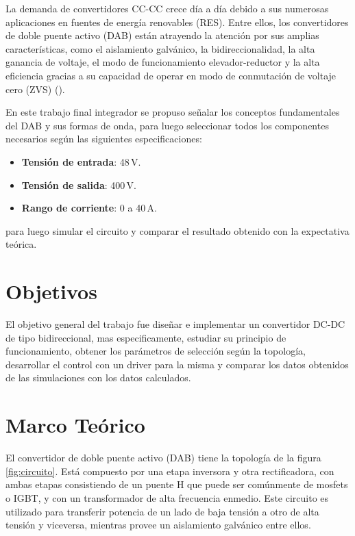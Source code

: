 \documentclass[11pt, a4paper]{article}
\begin{document}
La demanda de convertidores CC-CC crece día a día debido a sus numerosas aplicaciones en fuentes de energía renovables (RES). Entre ellos, los convertidores de doble puente activo (DAB) están atrayendo la atención por sus amplias características, como el aislamiento galvánico, la bidireccionalidad, la alta ganancia de voltaje, el modo de funcionamiento elevador-reductor y la alta eficiencia gracias a su capacidad de operar en modo de conmutación de voltaje cero (ZVS) (\cite{navamani}).

En este trabajo final integrador se propuso señalar los conceptos fundamentales del DAB y sus formas de onda, para luego seleccionar todos los componentes necesarios según las siguientes especificaciones:

\begin{itemize}
    \item \textbf{Tensión de entrada}: 48\,V.
    \item \textbf{Tensión de salida}: 400\,V.
    \item \textbf{Rango de corriente}: 0 a 40\,A.
\end{itemize}

\noindent
para luego simular el circuito y comparar el resultado obtenido con la expectativa teórica.

\section{Objetivos}

El objetivo general del trabajo fue diseñar e implementar un convertidor DC-DC de tipo bidireccional, mas especificamente, estudiar su principio de funcionamiento, obtener los parámetros de selección según la topología, desarrollar el control con un driver para la misma y comparar los datos obtenidos de las simulaciones con los datos calculados.

\section{Marco Teórico}

El convertidor de doble puente activo (DAB) tiene la topología de la figura \ref{fig:circuito}. Está compuesto por una etapa inversora y otra rectificadora, con ambas etapas consistiendo de un puente H que puede ser comúnmente de mosfets o IGBT, y con un transformador de alta frecuencia enmedio. Este circuito es utilizado para transferir potencia de un lado de baja tensión a otro de alta tensión y viceversa, mientras provee un aislamiento galvánico entre ellos.
\end{document}
